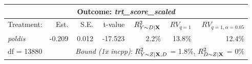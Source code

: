 \begin{table}[!h]
\centering
\begin{tabular}{lrrrrrr}
\multicolumn{7}{c}{Outcome: \textit{trt_score_scaled}} \\
\hline \hline 
Treatment: & Est. & S.E. & t-value & $R^2_{Y \sim D |{\bf X}}$ & $RV_{q = 1}$ & $RV_{q = 1, \alpha = 0.05}$  \\ 
\hline 
\textit{poldis} & -0.209 & 0.012 & -17.523 & 2.2\% & 13.8\% & 12.4\% \\ 
\hline 
df = 13880 & & \multicolumn{5}{r}{ \small \textit{Bound (1x incpp)}: $R^2_{Y\sim Z| {\bf X}, D}$ = 1.8\%, $R^2_{D\sim Z| {\bf X} }$ = 0\%} \\
\end{tabular}
\end{table}
